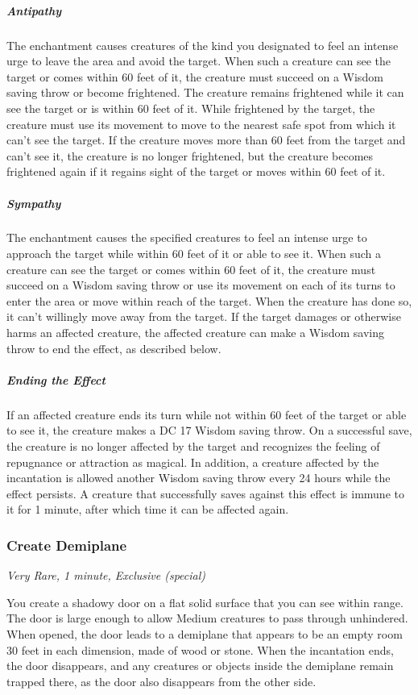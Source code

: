 \subparagraph*{Antipathy} The enchantment causes creatures of the kind you designated to feel an intense urge to leave the area and avoid the target. When such a creature can see the target or comes within 60 feet of it, the creature must succeed on a Wisdom saving throw or become frightened. The creature remains frightened while it can see the target or is within 60 feet of it. While frightened by the target, the creature must use its movement to move to the nearest safe spot from which it can't see the target. If the creature moves more than 60 feet from the target and can't see it, the creature is no longer frightened, but the creature becomes frightened again if it regains sight of the target or moves within 60 feet of it.

\subparagraph*{Sympathy} The enchantment causes the specified creatures to feel an intense urge to approach the target while within 60 feet of it or able to see it. When such a creature can see the target or comes within 60 feet of it, the creature must succeed on a Wisdom saving throw or use its movement on each of its turns to enter the area or move within reach of the target. When the creature has done so, it can't willingly move away from the target. If the target damages or otherwise harms an affected creature, the affected creature can make a Wisdom saving throw to end the effect, as described below.

\subparagraph*{Ending the Effect} If an affected creature ends its turn while not within 60 feet of the target or able to see it, the creature makes a DC 17 Wisdom saving throw. On a successful save, the creature is no longer affected by the target and recognizes the feeling of repugnance or attraction as magical. In addition, a creature affected by the incantation is allowed another Wisdom saving throw every 24 hours while the effect persists. A creature that successfully saves against this effect is immune to it for 1 minute, after which time it can be affected again.

\subsubsection{Create Demiplane}

\textit{Very Rare, 1 minute, Exclusive (special)}

You create a shadowy door on a flat solid surface that you can see within range. The door is large enough to allow Medium creatures to pass through unhindered. When opened, the door leads to a demiplane that appears to be an empty room 30 feet in each dimension, made of wood or stone. When the incantation ends, the door disappears, and any creatures or objects inside the demiplane remain trapped there, as the door also disappears from the other side.

